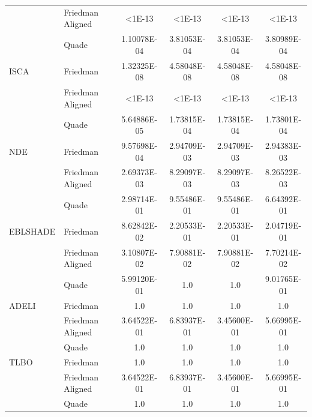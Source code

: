 \documentclass[a4paper,fleqn]{cas-dc}
\begin{document}
\begin{table}[<options>]
\begin{tabular*}{\tblwidth}{@{}LLCCCC@{}}
&Friedman Aligned&<1E-13&<1E-13&<1E-13&<1E-13\\
&Quade&1.10078E-04&3.81053E-04&3.81053E-04&3.80989E-04\\
ISCA&Friedman&1.32325E-08&4.58048E-08&4.58048E-08&4.58048E-08\\
&Friedman Aligned&<1E-13&<1E-13&<1E-13&<1E-13\\
&Quade&5.64886E-05&1.73815E-04&1.73815E-04&1.73801E-04\\
NDE&Friedman&9.57698E-04&2.94709E-03&2.94709E-03&2.94383E-03\\
&Friedman Aligned&2.69373E-03&8.29097E-03&8.29097E-03&8.26522E-03\\
&Quade&2.98714E-01&9.55486E-01&9.55486E-01&6.64392E-01\\
EBLSHADE&Friedman&8.62842E-02&2.20533E-01&2.20533E-01&2.04719E-01\\
&Friedman Aligned&3.10807E-02&7.90881E-02&7.90881E-02&7.70214E-02\\
&Quade&5.99120E-01&1.0&1.0&9.01765E-01\\
ADELI&Friedman&1.0&1.0&1.0&1.0\\
&Friedman Aligned&3.64522E-01&6.83937E-01&3.45600E-01&5.66995E-01\\
&Quade&1.0&1.0&1.0&1.0\\
TLBO&Friedman&1.0&1.0&1.0&1.0\\
&Friedman Aligned&3.64522E-01&6.83937E-01&3.45600E-01&5.66995E-01\\
&Quade&1.0&1.0&1.0&1.0\\
\bottomrule
\end{tabular*}
\end{table}
\end{document}
